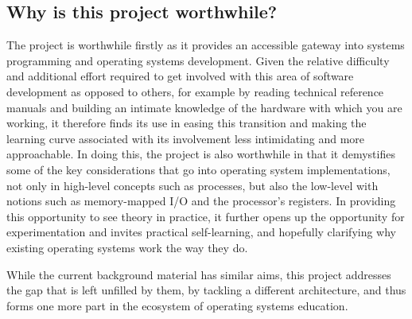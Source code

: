 \subsection{Why is this project worthwhile?}
    The project is worthwhile firstly as it provides an accessible gateway into
    systems programming and operating systems development. Given the relative
    difficulty and additional effort required to get involved with this area of
    software development as opposed to others, for example by reading technical
    reference manuals and building an intimate knowledge of the hardware with
    which you are working, it therefore finds its use in easing this transition
    and making the learning curve associated with its involvement less
    intimidating and more approachable. In doing this, the project is also
    worthwhile in that it demystifies some of the key considerations that go
    into operating system implementations, not only in high-level concepts such
    as processes, but also the low-level with notions such as memory-mapped I/O
    and the processor's registers. In providing this opportunity to see theory
    in practice, it further opens up the opportunity for experimentation and
    invites practical self-learning, and hopefully clarifying why existing
    operating systems work the way they do.

    While the current background material has similar aims, this project
    addresses the gap that is left unfilled by them, by tackling a different
    architecture, and thus forms one more part in the ecosystem of operating
    systems education.
